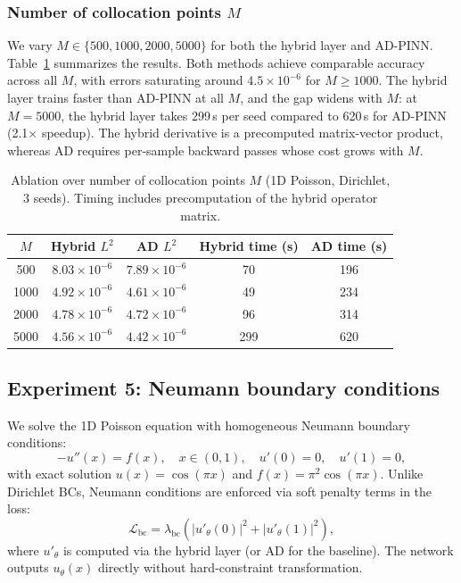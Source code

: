 \documentclass[sn-mathphys,Numbered]{sn-jnl}
\theoremstyle{thmstyleone}
\theoremstyle{thmstyletwo}
\theoremstyle{thmstylethree}
\begin{document}
\subsubsection{Number of collocation points $M$}
We vary $M \in \{500, 1000, 2000, 5000\}$ for both the hybrid layer and AD-PINN. Table~\ref{tab:ablation_M} summarizes the results. Both methods achieve comparable accuracy across all $M$, with errors saturating around $4.5\times10^{-6}$ for $M\geq1000$. The hybrid layer trains faster than AD-PINN at all $M$, and the gap widens with $M$: at $M=5000$, the hybrid layer takes 299\,s per seed compared to 620\,s for AD-PINN (2.1$\times$ speedup). The hybrid derivative is a precomputed matrix-vector product, whereas AD requires per-sample backward passes whose cost grows with $M$.

\begin{table}[t]
\centering
\caption{Ablation over number of collocation points $M$ (1D Poisson, Dirichlet, 3 seeds). Timing includes precomputation of the hybrid operator matrix.}
\label{tab:ablation_M}
\begin{tabular}{ccccc}
\toprule
$M$ & Hybrid $L^2$ & AD $L^2$ & Hybrid time (s) & AD time (s) \\
\midrule
500  & $8.03\times10^{-6}$ & $7.89\times10^{-6}$ & 70 & 196 \\
1000 & $4.92\times10^{-6}$ & $4.61\times10^{-6}$ & 49 & 234 \\
2000 & $4.78\times10^{-6}$ & $4.72\times10^{-6}$ & 96 & 314 \\
5000 & $4.56\times10^{-6}$ & $4.42\times10^{-6}$ & 299 & 620 \\
\bottomrule
\end{tabular}
\end{table}

\subsection{Experiment 5: Neumann boundary conditions}\label{subsec:exp5}
We solve the 1D Poisson equation with homogeneous Neumann boundary conditions:
\begin{equation}
    -u''(x) = f(x), \quad x \in (0,1), \quad u'(0) = 0, \quad u'(1) = 0,
\end{equation}
with exact solution $u(x) = \cos(\pi x)$ and $f(x) = \pi^2 \cos(\pi x)$. Unlike Dirichlet BCs, Neumann conditions are enforced via soft penalty terms in the loss:
\begin{equation}
    \mathcal{L}_{\mathrm{bc}} = \lambda_{\mathrm{bc}} \left( |u'_\theta(0)|^2 + |u'_\theta(1)|^2 \right),
\end{equation}
where $u'_\theta$ is computed via the hybrid layer (or AD for the baseline). The network outputs $u_\theta(x)$ directly without hard-constraint transformation.
\end{document}
